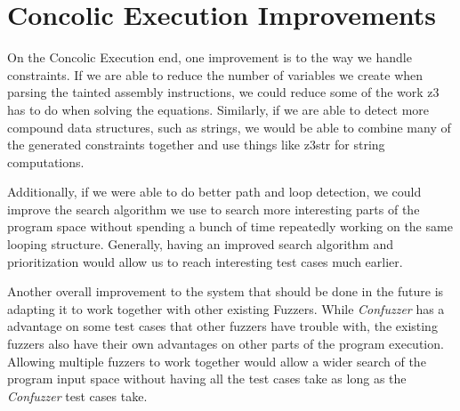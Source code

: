\section{Concolic Execution Improvements}
On the Concolic Execution end, one improvement is to the way we handle
constraints. If we are able to reduce the number of variables we create when
parsing the tainted assembly instructions, we could reduce some of the work z3
has to do when solving the equations. Similarly, if we are able to detect more
compound data structures, such as strings, we would be able to combine many of
the generated constraints together and use things like z3str for string
computations.

Additionally, if we were able to do better path and loop detection, we could
improve the search algorithm we use to search more interesting parts of the
program space without spending a bunch of time repeatedly working on the same
looping structure. Generally, having an improved search algorithm and
prioritization would allow us to reach interesting test cases much earlier.

Another overall improvement to the system that should be done in the future is
adapting it to work together with other existing Fuzzers. While
\textit{Confuzzer} has a advantage on some test cases that other fuzzers have
trouble with, the existing fuzzers also have their own advantages on other parts
of the program execution. Allowing multiple fuzzers to work together would allow
a wider search of the program input space without having all the test cases take
as long as the \textit{Confuzzer} test cases take.